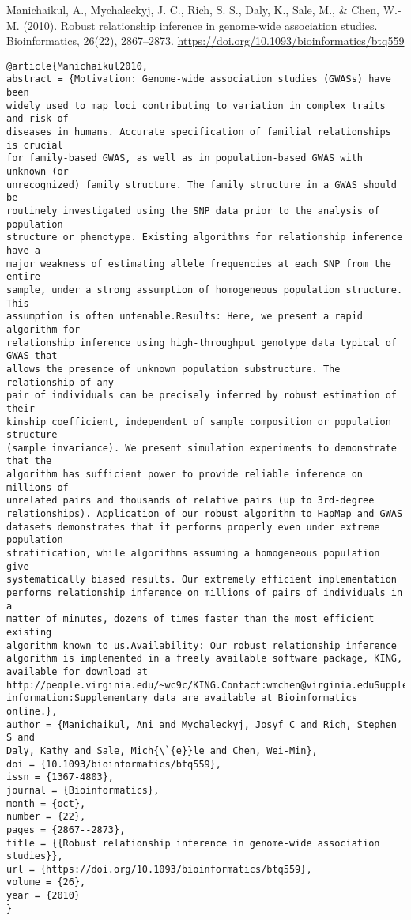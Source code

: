\documentclass[]{article}
\begin{document}
Manichaikul, A., Mychaleckyj, J. C., Rich, S. S., Daly, K., Sale, M., \& Chen, W.-M. (2010). Robust relationship inference in genome-wide association studies. Bioinformatics, 26(22), 2867–2873. \url{https://doi.org/10.1093/bioinformatics/btq559}

\begin{verbatim}
@article{Manichaikul2010,
abstract = {Motivation: Genome-wide association studies (GWASs) have been
widely used to map loci contributing to variation in complex traits and risk of
diseases in humans. Accurate specification of familial relationships is crucial
for family-based GWAS, as well as in population-based GWAS with unknown (or
unrecognized) family structure. The family structure in a GWAS should be
routinely investigated using the SNP data prior to the analysis of population
structure or phenotype. Existing algorithms for relationship inference have a
major weakness of estimating allele frequencies at each SNP from the entire
sample, under a strong assumption of homogeneous population structure. This
assumption is often untenable.Results: Here, we present a rapid algorithm for
relationship inference using high-throughput genotype data typical of GWAS that
allows the presence of unknown population substructure. The relationship of any
pair of individuals can be precisely inferred by robust estimation of their
kinship coefficient, independent of sample composition or population structure
(sample invariance). We present simulation experiments to demonstrate that the
algorithm has sufficient power to provide reliable inference on millions of
unrelated pairs and thousands of relative pairs (up to 3rd-degree
relationships). Application of our robust algorithm to HapMap and GWAS
datasets demonstrates that it performs properly even under extreme population
stratification, while algorithms assuming a homogeneous population give
systematically biased results. Our extremely efficient implementation
performs relationship inference on millions of pairs of individuals in a
matter of minutes, dozens of times faster than the most efficient existing
algorithm known to us.Availability: Our robust relationship inference
algorithm is implemented in a freely available software package, KING,
available for download at
http://people.virginia.edu/~wc9c/KING.Contact:wmchen@virginia.eduSupplementary
information:Supplementary data are available at Bioinformatics online.},
author = {Manichaikul, Ani and Mychaleckyj, Josyf C and Rich, Stephen S and
Daly, Kathy and Sale, Mich{\`{e}}le and Chen, Wei-Min},
doi = {10.1093/bioinformatics/btq559},
issn = {1367-4803},
journal = {Bioinformatics},
month = {oct},
number = {22},
pages = {2867--2873},
title = {{Robust relationship inference in genome-wide association studies}},
url = {https://doi.org/10.1093/bioinformatics/btq559},
volume = {26},
year = {2010}
}
\end{verbatim}
\end{document}
